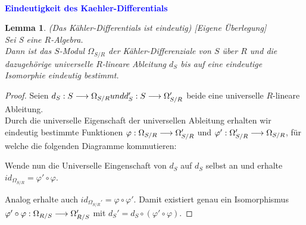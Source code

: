 \documentclass[10pt,a4paper]{report}
\newcounter{Aussage}[chapter]
\newtheorem{lemma}[Aussage]{Lemma}
\newcommand{\functionfront}[3]{\nolinebreak{#1:#2 \longrightarrow #3}}
\newcommand{\divR}[2]{\Omega_{#1/#2}}
\newcommand{\divf}[1]{d_{#1}}
\begin{document}
\ \\
\textcolor{blue}{\textbf{Eindeutigkeit des Kaehler-Differentials}}
\begin{lemma}\label{Eindeutigkeit des Kaehler-Differentials}(Das Kähler-Differentials ist eindeutig) \textit{[Eigene Überlegung]}\\
Sei S eine $R$-Algebra.\\
Dann ist das $S$-Modul $\divR{S}{R}$ der Kähler-Differenziale von $S$ über $R$ und die dazugehörige universelle $R$-lineare Ableitung $\divf{S}$ bis auf eine eindeutige Isomorphie eindeutig bestimmt.
\end{lemma}
\begin{proof}
Seien $\functionfront{\divf{S}}{S}{\divR{S}{R}} und \functionfront{\divf{S}'}{S}{\divR{S}{R}'}$ beide eine universelle $R$-lineare Ableitung.\\
Durch die universelle Eigenschaft der universellen Ableitung erhalten wir eindeutig bestimmte Funktionen
$\functionfront{\varphi}{\divR{S}{R}}{\divR{S}{R}'}$ und $\functionfront{\varphi'}{\divR{S}{R}'}{\divR{S}{R}}$, für welche die folgenden Diagramme kommutieren:
\begin{center}
\end{center}
Wende nun die Universelle Eingenschaft von $\divf{S}$ auf $\divf{S}$ selbst an und erhalte $id_{\divR{S}{R}} = \varphi' \circ \varphi$. 
\begin{center}
\end{center}
Analog erhalte auch $id_{\divR{S}{R}'} = \varphi \circ \varphi'$. Damit existiert genau ein Isomorphismus $\functionfront{\varphi' \circ \varphi}{\divR{R}{S}}{\divR{R}{S}'}$ mit $\divf{S}' = \divf{S} \circ (\varphi' \circ \varphi)$.
\end{proof}
\end{document}

